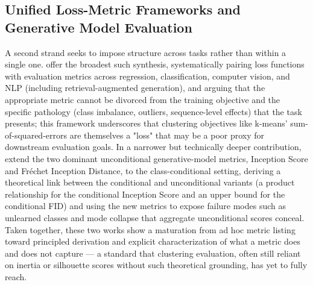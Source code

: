 \subsection{Unified Loss-Metric Frameworks and Generative Model Evaluation}
A second strand seeks to impose structure across tasks rather than within a single one. \cite{terven2025comprehensive} offer the broadest such synthesis, systematically pairing loss functions with evaluation metrics across regression, classification, computer vision, and NLP (including retrieval-augmented generation), and arguing that the appropriate metric cannot be divorced from the training objective and the specific pathology (class imbalance, outliers, sequence-level effects) that the task presents; this framework underscores that clustering objectives like k-means' sum-of-squared-errors are themselves a "loss" that may be a poor proxy for downstream evaluation goals. In a narrower but technically deeper contribution, \cite{benny2021evaluation} extend the two dominant unconditional generative-model metrics, Inception Score and Fr{\'e}chet Inception Distance, to the class-conditional setting, deriving a theoretical link between the conditional and unconditional variants (a product relationship for the conditional Inception Score and an upper bound for the conditional FID) and using the new metrics to expose failure modes such as unlearned classes and mode collapse that aggregate unconditional scores conceal. Taken together, these two works show a maturation from ad hoc metric listing toward principled derivation and explicit characterization of what a metric does and does not capture --- a standard that clustering evaluation, often still reliant on inertia or silhouette scores without such theoretical grounding, has yet to fully reach.

